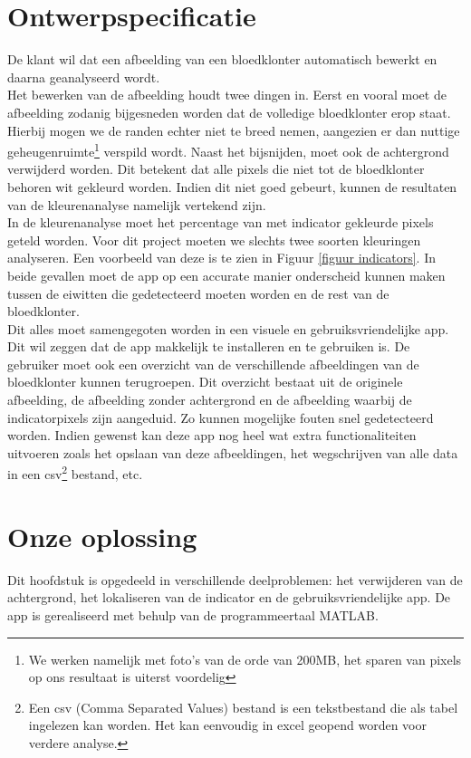 \documentclass[a4paper,kulak]{kulakarticle}
\begin{document}
\section{Ontwerpspecificatie}
De klant wil dat een afbeelding van een bloedklonter automatisch bewerkt en daarna geanalyseerd wordt.\\
Het bewerken van de afbeelding houdt twee dingen in. Eerst en vooral moet de afbeelding zodanig bijgesneden worden dat de volledige bloedklonter erop staat. Hierbij mogen we de randen echter niet te breed nemen, aangezien er dan nuttige geheugenruimte\footnote{We werken namelijk met foto's van de orde van 200MB, het sparen van pixels op ons resultaat is uiterst voordelig} verspild wordt. 
Naast het bijsnijden, moet ook de achtergrond verwijderd worden. Dit betekent dat alle pixels die niet tot de bloedklonter behoren wit gekleurd worden. Indien dit niet goed gebeurt, kunnen de resultaten van de kleurenanalyse namelijk vertekend zijn.\\
In de kleurenanalyse moet het percentage van met indicator gekleurde pixels geteld worden. Voor dit project moeten we slechts twee soorten kleuringen analyseren. Een voorbeeld van deze is te zien in Figuur \ref{figuur indicators}. In beide gevallen moet de app op een accurate manier onderscheid kunnen maken tussen de eiwitten die gedetecteerd moeten worden en de rest van de bloedklonter. \\
Dit alles moet samengegoten worden in een visuele en gebruiksvriendelijke app. Dit wil zeggen dat de app makkelijk te installeren en te gebruiken is. De gebruiker moet ook een overzicht van de verschillende afbeeldingen van de bloedklonter kunnen terugroepen. Dit overzicht bestaat uit de originele afbeelding, de afbeelding zonder achtergrond en de afbeelding waarbij de indicatorpixels zijn aangeduid. Zo kunnen mogelijke fouten snel gedetecteerd worden. Indien gewenst kan deze app nog heel wat extra functionaliteiten uitvoeren zoals het opslaan van deze afbeeldingen, het wegschrijven van alle data in een csv\footnote{Een csv (Comma Separated Values) bestand is een tekstbestand die als tabel ingelezen kan worden. Het kan eenvoudig in excel geopend worden voor verdere analyse.} bestand, etc.

\section{Onze oplossing}
Dit hoofdstuk is opgedeeld in verschillende deelproblemen: het verwijderen van de achtergrond, het lokaliseren van de indicator en de gebruiksvriendelijke app. De app is gerealiseerd met behulp van de programmeertaal MATLAB.
\end{document}
